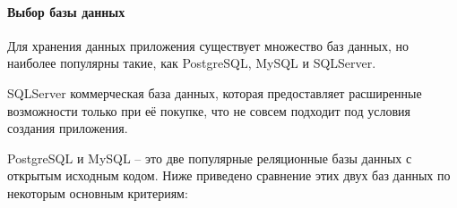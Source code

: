 \paragraph{Выбор базы данных}

Для хранения данных приложения существует множество баз данных,
но наиболее популярны такие, как PostgreSQL, MySQL и SQLServer.

SQLServer коммерческая база данных, которая предоставляет
расширенные возможности только при её покупке, что не совсем подходит под
условия создания приложения.

PostgreSQL и MySQL – это две популярные реляционные базы данных с
открытым исходным кодом. Ниже приведено сравнение этих двух баз данных
по некоторым основным критериям:





